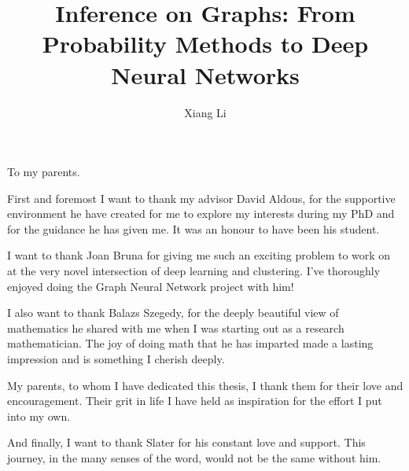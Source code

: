 \documentclass{ucbthesis}
\theoremstyle{definition}
\theoremstyle{remark}
\begin{document}

\title{Inference on Graphs: From Probability Methods to Deep Neural Networks}
\author{Xiang Li}






\maketitle
\approvalpage
\copyrightpage



\begin{frontmatter}

\begin{dedication}
\null\vfil
\begin{center}
To my parents. \\\vspace{12pt}

\end{center}
\vfil\null
\end{dedication}

\tableofcontents
\clearpage
\listoffigures
\clearpage


\begin{acknowledgements}
First and foremost I want to thank my advisor David Aldous, for the supportive environment he have created for me to explore my interests during my PhD and for the guidance he has given me.  It was an honour to have been his student.

I want to thank Joan Bruna for giving me such an exciting problem to work on at the very novel intersection of deep learning and clustering. I've thoroughly enjoyed doing the Graph Neural Network project with him!

I also want to thank Balazs Szegedy, for the deeply beautiful view of mathematics he shared with me when I was starting out as a research mathematician. The joy of doing math that he has imparted made a lasting impression and is something I cherish deeply.  

My parents, to whom I have dedicated this thesis, I thank them for their love and encouragement. Their grit in life I have held as inspiration for the effort I put into my own.

And finally, I want to thank Slater for his constant love and support. This journey, in the many senses of the word, would not be the same without him.  

\end{acknowledgements}

\end{frontmatter}
\end{document}
